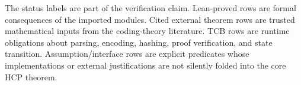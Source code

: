 The status labels are part of the verification claim. Lean-proved rows are
formal consequences of the imported modules. Cited external theorem rows are
trusted mathematical inputs from the coding-theory literature. TCB rows are
runtime obligations about parsing, encoding, hashing, proof verification, and
state transition. Assumption/interface rows are explicit predicates whose
implementations or external justifications are not silently folded into the
core HCP theorem.
